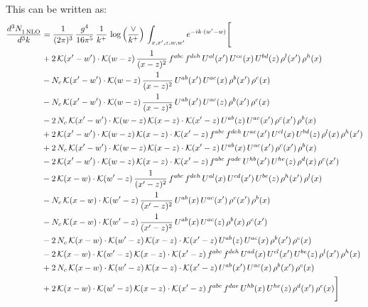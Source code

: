 \documentclass[9pt]{article}
\numberwithin{equation}{section}
\begin{document}
This can be written as:
\begin{align}
    \frac{d^{3}N_{1\,\rm NLO}^{\rm}}{d^{3}k}  & = \frac{1}{(2\pi)^{3}}\,\frac{g^{4}}{16\pi^{5}}\,\frac{1}{k^{+}}\,\log{\left(\frac{\vee}{k^{+}}\right)}\, \int_{x,x',z,w,w'}e^{-ik\cdot(w'-w)}\Bigg[\notag\\ & +2\,\mathcal{K}(x'-w')\cdot\mathcal{K}(w-z)\,\frac{1}{(x-z)^{2}}\,f^{abc}\,f^{deh}\,U^{al}(x')\,U^{ce}(x)\,U^{bd}(z)\,\rho^{l}(x')\,\rho^{h}(x)\notag \\ 
&-N_{c}\,\mathcal{K}(x'-w')\cdot\mathcal{K}(w-z)\,\frac{1}{(x-z)^{2}}\,U^{ab}(x')\,U^{ac}(x)\,\rho^{b}(x')\,\rho^{c}(x)\notag \\ 
&-N_{c}\,\mathcal{K}(x'-w')\cdot\mathcal{K}(w-z)\,\frac{1}{(x-z)^{2}}\,U^{ab}(x')\,U^{ac}(z)\,\rho^{b}(x')\,\rho^{c}(x)\notag \\ 
&-2\,N_{c}\,\mathcal{K}(x'-w')\cdot\mathcal{K}(w-z)\,\mathcal{K}(x-z)\cdot\mathcal{K}(x'-z)\,U^{ab}(z)\,U^{ac}(x')\,\rho^{c}(x')\,\rho^{b}(x)\notag \\ 
&+2\,\mathcal{K}(x'-w')\cdot\mathcal{K}(w-z)\,\mathcal{K}(x-z)\cdot\mathcal{K}(x'-z)\,f^{abc}\,f^{deh}\,U^{ae}(x')\,U^{cl}(x)\,U^{bd}(z)\,\rho^{l}(x)\,\rho^{h}(x')\notag \\ 
&+2\,N_{c}\,\mathcal{K}(x'-w')\cdot\mathcal{K}(w-z)\,\mathcal{K}(x-z)\cdot\mathcal{K}(x'-z)\,U^{ab}(x)\,U^{ac}(x')\,\rho^{c}(x')\,\rho^{b}(x)\notag \\ 
&-2\,\mathcal{K}(x'-w')\cdot\mathcal{K}(w-z)\,\mathcal{K}(x-z)\cdot\mathcal{K}(x'-z)\,f^{abc}\,f^{ade}\,U^{hb}(x')\,U^{he}(z)\,\rho^{d}(x)\,\rho^{c}(x')\notag \\ 
&-2\,\mathcal{K}(x-w)\cdot\mathcal{K}(w'-z)\,\frac{1}{(x'-z)^{2}}\,f^{abc}\,f^{deh}\,U^{al}(x)\,U^{cd}(x')\,U^{be}(z)\,\rho^{h}(x')\,\rho^{l}(x)\notag \\ 
&-N_{c}\,\mathcal{K}(x-w)\cdot\mathcal{K}(w'-z)\,\frac{1}{(x'-z)^{2}}\,U^{ab}(x)\,U^{ac}(x')\,\rho^{c}(x')\,\rho^{b}(x)\notag \\ 
&-N_{c}\,\mathcal{K}(x-w)\cdot\mathcal{K}(w'-z)\,\frac{1}{(x'-z)^{2}}\,U^{ab}(x)\,U^{ac}(z)\,\rho^{b}(x)\,\rho^{c}(x')\notag \\ 
&-2\,N_{c}\,\mathcal{K}(x-w)\cdot\mathcal{K}(w'-z)\,\mathcal{K}(x-z)\cdot\mathcal{K}(x'-z)\,U^{ab}(z)\,U^{ac}(x)\,\rho^{b}(x')\,\rho^{c}(x)\notag \\ 
&-2\,\mathcal{K}(x-w)\cdot\mathcal{K}(w'-z)\,\mathcal{K}(x-z)\cdot\mathcal{K}(x'-z)\,f^{abc}\,f^{deh}\,U^{ad}(x)\,U^{cl}(x')\,U^{be}(z)\,\rho^{l}(x')\,\rho^{h}(x)\notag \\ 
&+2\,N_{c}\,\mathcal{K}(x-w)\cdot\mathcal{K}(w'-z)\,\mathcal{K}(x-z)\cdot\mathcal{K}(x'-z)\,U^{ab}(x')\,U^{ac}(x)\,\rho^{b}(x')\,\rho^{c}(x)\notag \\ 
&+2\,\mathcal{K}(x-w)\cdot\mathcal{K}(w'-z)\,\mathcal{K}(x-z)\cdot\mathcal{K}(x'-z)\,f^{abc}\,f^{dae}\,U^{hb}(x)\,U^{he}(z)\,\rho^{d}(x')\,\rho^{c}(x)\Bigg]
\end{align}
\end{document}

